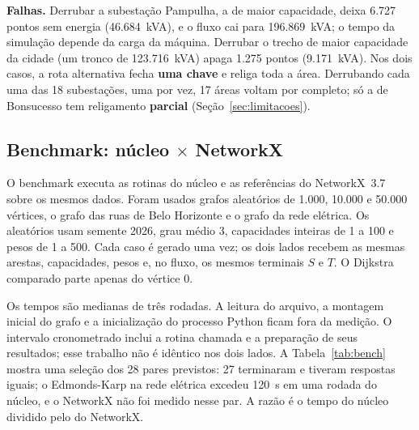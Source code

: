 \documentclass[12pt]{article}
\begin{document}
\textbf{Falhas.} Derrubar a subestação Pampulha, a de maior capacidade, deixa 6.727 pontos sem energia (46.684~kVA), e o fluxo cai para 196.869~kVA; o tempo da simulação depende da carga da máquina. Derrubar o trecho de maior capacidade da cidade (um tronco de 123.716~kVA) apaga 1.275 pontos (9.171~kVA). Nos dois casos, a rota alternativa fecha \textbf{uma chave} e religa toda a área. Derrubando cada uma das 18 subestações, uma por vez, 17 áreas voltam por completo; só a de Bonsucesso tem religamento \textbf{parcial} (Seção~\ref{sec:limitacoes}).

\subsection{Benchmark: núcleo $\times$ NetworkX}
\label{sec:benchmark}

O benchmark executa as rotinas do núcleo e as referências do NetworkX~3.7 sobre os mesmos dados. Foram usados grafos aleatórios de 1.000, 10.000 e 50.000 vértices, o grafo das ruas de Belo Horizonte e o grafo da rede elétrica. Os aleatórios usam semente 2026, grau médio 3, capacidades inteiras de 1 a 100 e pesos de 1 a 500. Cada caso é gerado uma vez; os dois lados recebem as mesmas arestas, capacidades, pesos e, no fluxo, os mesmos terminais $S$ e $T$. O Dijkstra comparado parte apenas do vértice 0.

Os tempos são medianas de três rodadas. A leitura do arquivo, a montagem inicial do grafo e a inicialização do processo Python ficam fora da medição. O intervalo cronometrado inclui a rotina chamada e a preparação de seus resultados; esse trabalho não é idêntico nos dois lados. A Tabela~\ref{tab:bench} mostra uma seleção dos 28 pares previstos: 27 terminaram e tiveram respostas iguais; o Edmonds-Karp na rede elétrica excedeu 120~s em uma rodada do núcleo, e o NetworkX não foi medido nesse par. A razão é o tempo do núcleo dividido pelo do NetworkX.
\end{document}
